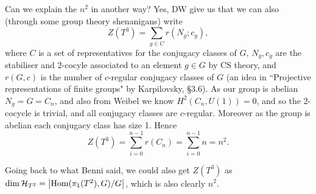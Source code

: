 \documentclass{article}
\begin{document}
Can we explain the $n^2$ in another way? Yes, DW give us that we can also (through some group theory shenanigans) write 
\[
Z(T^3) = \sum_{g \in C} r(N_g; c_g),
\]
where $C$ is a set of representatives for the conjugacy classes of $G$, $N_g, c_g$ are the stabiliser and 2-cocyle associated to an element $g \in G$ by CS theory, and $r(G, c)$ is the number of $c$-regular conjugacy classes of $G$ (an idea in ``Projective representations of finite groups" by Karpilovsky, \S3.6). As our group is abelian $N_g = G = C_n$, and also from Weibel we know $H^2(C_n, U(1))=0$, and so the 2-cocycle is trivial, and all conjugacy classes are $c$-regular. Moreover as the group is abelian each conjugacy class has size 1. Hence 
\[
Z(T^3) = \sum_{i=0}^{n-1} r(C_n) = \sum_{i=0}^{n-1} n = n^2. 
\]


Going back to what Benni said, we could also get $Z(T^3)$ as $\dim \mathcal{H}_{T^2} = \left\lvert \operatorname{Hom}(\pi_1(T^2), G)/G \right\rvert$, which is also clearly $n^2$. 


\end{document}
